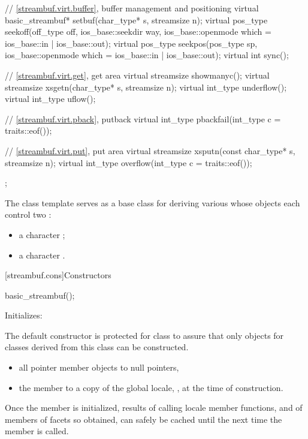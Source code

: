 \begin{codeblock}
{{    // \ref{streambuf.virt.buffer}, buffer management and positioning
    virtual basic_streambuf* setbuf(char_type* s, streamsize n);
    virtual pos_type seekoff(off_type off, ios_base::seekdir way,
                             ios_base::openmode which
                               = ios_base::in | ios_base::out);
    virtual pos_type seekpos(pos_type sp,
                             ios_base::openmode which
                               = ios_base::in | ios_base::out);
    virtual int      sync();

    // \ref{streambuf.virt.get}, get area
    virtual streamsize showmanyc();
    virtual streamsize xsgetn(char_type* s, streamsize n);
    virtual int_type   underflow();
    virtual int_type   uflow();

    // \ref{streambuf.virt.pback}, putback
    virtual int_type   pbackfail(int_type c = traits::eof());

    // \ref{streambuf.virt.put}, put area
    virtual streamsize xsputn(const char_type* s, streamsize n);
    virtual int_type   overflow(int_type c = traits::eof());
  };
}
\end{codeblock}

\pnum
The class template
serves as a base class for deriving various
whose objects each control two
:
\begin{itemize}
\item
a character
;
\item
a character
.
\end{itemize}

[streambuf.cons]{Constructors}

%
\begin{itemdecl}
basic_streambuf();
\end{itemdecl}

\begin{itemdescr}
\pnum
\effects
Initializes:
\begin{footnote}
The default constructor is protected for class
to assure that only objects for classes
derived from this class can be constructed.
\end{footnote}
\begin{itemize}
\item
all pointer member objects to null pointers,
\item
the
member to a copy of the global locale,
,
at the time of construction.
\end{itemize}

\pnum
\remarks
Once the
member is initialized, results of calling locale member functions,
and of members of facets so obtained, can safely be cached until the
next time the member
is called.
\end{itemdescr}

